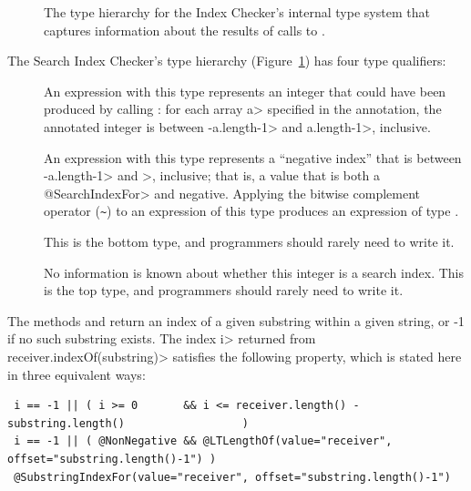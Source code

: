 \begin{figure}
\begin{center}
  \hfill
  \hfill
\end{center}
  \caption{The type hierarchy for the Index Checker's internal type system
  that captures information about the results of calls to
  .}
  \label{fig-index-searchindex}
\end{figure}

The Search Index Checker's type hierarchy (Figure~\ref{fig-index-searchindex}) has four type qualifiers:
\begin{description}
\item[]
  An expression with this type represents an integer that could have been
  produced by calling
  :
  for each array \<a> specified in the annotation, the annotated integer is
  between \<-a.length-1> and \<a.length-1>, inclusive.
\item[]
  An expression with this type represents a ``negative index'' that is
  between \<-a.length-1> and >, inclusive; that is, a value that is both
  a \<@SearchIndexFor> and negative.  Applying the bitwise complement
  operator (\verb|~|) to an expression of this type produces an expression
  of type .
\item[]
  This is the bottom type, and programmers should rarely need to write it.
\item[]
  No information is known about whether this integer is a search index.
  This is the top type, and programmers should rarely need to write it.
\end{description}



The methods
and
return an index of a given substring within a given string, or -1 if no
such substring exists.  The index \<i> returned from
\<receiver.indexOf(substring)> satisfies the following property, which is
stated here in three equivalent ways:
\begin{Verbatim}
 i == -1 || ( i >= 0       && i <= receiver.length() - substring.length()                  )
 i == -1 || ( @NonNegative && @LTLengthOf(value="receiver", offset="substring.length()-1") )
 @SubstringIndexFor(value="receiver", offset="substring.length()-1")
\end{Verbatim}


